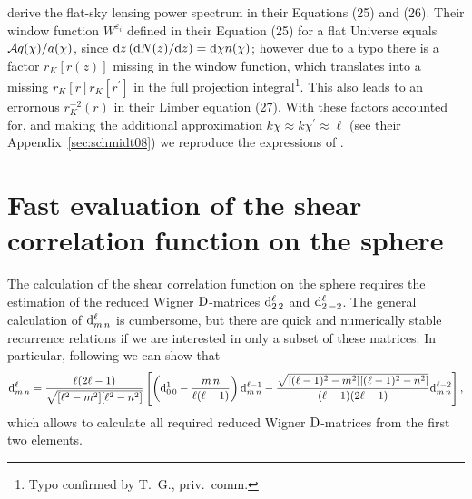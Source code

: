 \documentclass[fleqn,usenatbib]{mnras} %
\newcommand{\pref}{{\cal A}}
\begin{document}
\begin{appendix}
\cite{2012MNRAS.422.2854G} derive the flat-sky lensing power spectrum in their
Equations (25) and (26). Their window function $W^{\varepsilon_i}$ defined in
their Equation (25) for a flat Universe equals $\pref q(\chi) / a(\chi)$, since
${\rm d} z \, ({\rm d} N(z)/{\rm d} z) = {\rm d} \chi n(\chi)$; however due to
a typo there is a factor $r_K[r(z)]$ missing in the window function, which
translates into a missing $r_K[r] r_K[r^\prime]$ in the full projection
integral\footnote{Typo confirmed by T.~G., priv.~comm.}. This also leads to an
errornous $r_K^{-2}(r)$ in their Limber equation (27). With these factors
accounted for, and making the additional approximation $k \chi \approx k
\chi^\prime \approx \ell$ (see their Appendix~\ref{sec:schmidt08}) we reproduce
the expressions of \cite{2012MNRAS.422.2854G}.

\section{Fast evaluation of the shear correlation function on the sphere}
\label{app:C}

The calculation of the shear correlation function on the sphere requires the
estimation of the reduced Wigner ${\rm D}$-matrices ${\rm d}^\ell_{2\,2}$ and
${\rm d}^\ell_{2\,-2}$. The general calculation of ${\rm d}^\ell_{m\,n}$ is
cumbersome, but there are quick and numerically stable recurrence relations if
we are interested in only a subset of these matrices. In particular, following
\citet{BLANCO199719} we can show that
%
\begin{equation}
%
{\rm d}^\ell_{m\,n}={\ell(2\ell-1)\over \sqrt{[\ell^2-m^2][\ell^2-n^2]}}
%
\left[ \left( {\rm d}^1_{0\,0}-{m\,n\over \ell(\ell-1)} \right) {\rm d}^{\ell-1}_{m\,n}
%
-{\sqrt{[(\ell-1)^2-m^2][(\ell-1)^2-n^2]}\over (\ell-1)(2\ell-1)} {\rm d}^{\ell-2}_{m\,n}\right] ,
%
\end{equation}
%
which allows to calculate all required reduced Wigner ${\rm D}$-matrices from the first two elements.

\label{lastpage}

\end{appendix}
\end{document}
